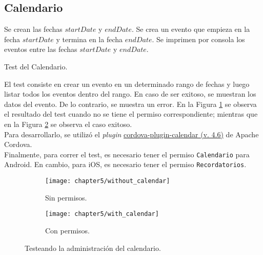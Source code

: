 \subsection{Calendario}
\begin{algorithm}
	\begin{algorithmic}[1]
		\STATE Se crean las fechas $startDate$ y $endDate$.
		\STATE Se crea un evento que empieza en la fecha $startDate$ y termina en la fecha $endDate$.
		\STATE Se imprimen por consola los eventos entre las fechas $startDate$ y $endDate$.
	\end{algorithmic}
	\caption{Test del Calendario.}\label{alg:chap5:test_calendario}
\end{algorithm}
El test consiste en crear un evento en un determinado rango de fechas y luego listar todos los eventos dentro del rango. En caso de ser exitoso, se muestran los datos del evento. De lo contrario, se muestra un error. En la Figura \ref{fig:ch05:without_calendar} se observa el resultado del test cuando no se tiene el permiso correspondiente; mientras que en la Figura \ref{fig:ch05:with_calendar} se observa el caso exitoso.\\

Para desarrollarlo, se utilizó el \textit{plugin} \href{https://www.npmjs.com/package/cordova-plugin-calendar}{cordova-plugin-calendar (v. 4.6)} de Apache Cordova.\\

Finalmente, para correr el test, es necesario tener el permiso \texttt{Calendario} para Android. En cambio, para iOS, es necesario tener el permiso \texttt{Recordatorios}.
\begin{figure}[tp]
    \centering
    \begin{subfigure}{0.3\linewidth}
        \texttt{[image: chapter5/without\_calendar]}
        \caption{Sin permisos.}
        \label{fig:ch05:without_calendar}
    \end{subfigure}
    \begin{subfigure}{0.3\linewidth}
        \texttt{[image: chapter5/with\_calendar]}
        \caption{Con permisos.}
        \label{fig:ch05:with_calendar}
    \end{subfigure}
    \caption{Testeando la administración del calendario.}
	\label{fig:ch05:calendar-cases}
\end{figure}
